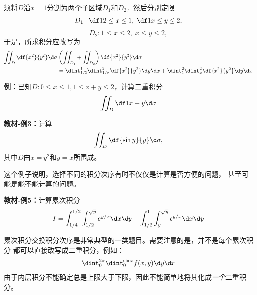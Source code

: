 \begin{center}
\end{center}

须将$D$沿$x=1$分割为两个子区域$D_1$和$D_2$，然后分别定限
$$D_1:\df12\leq x\leq 1,\;\df1x\leq y\leq 2,$$
$$D_2:1\leq x\leq 2,\;x\leq y\leq 2,$$
于是，所求积分应改写为
\begin{align*}
	\iint_D\df{x^2}{y^2}\d\sigma&
	\left(\iint_{D_1}+\iint_{D_2}\right)\df{x^2}{y^2}\d\sigma\\
	&=\dint_{1/2}^1\dint_{1/x}^2\df{x^2}{y^2}\d y\d x
	+\dint_1^2\dint_x^2\df{x^2}{y^2}\d y\d x
\end{align*}

{\bf 例：}已知$D:0\leq x\leq 1,1\leq x+y\leq 2$，计算二重积分
$$\iint_D\df1{x+y}\d\sigma$$

{\bf 教材-例3：}计算
$$\iint_D\df{\sin y}{y}\d\sigma,$$
其中$D$由$x=y^2$和$y=x$所围成。

这个例子说明，选择不同的积分次序有时不仅仅是计算是否方便的问题，
甚至可能是能不能计算的问题。

{\bf 教材-例5：}计算累次积分
$$I=\int_{1/4}^{1/2}\int_{1/2}^{\sqrt y}e^{y/x}\d x\d y+
\int_{1/2}^1\int_y^{\sqrt y}e^{y/x}\d x\d y$$

累次积分交换积分次序是非常典型的一类题目。需要注意的是，并不是每个累次积分
都可以直接改写成二重积分，例如：
$$\dint_0^{2\pi}\dint_0^{\sin x}f(x,y)\d y\d x$$
由于内层积分不能确定总是上限大于下限，因此不能简单地将其化成{\it 一个}二重积分。

